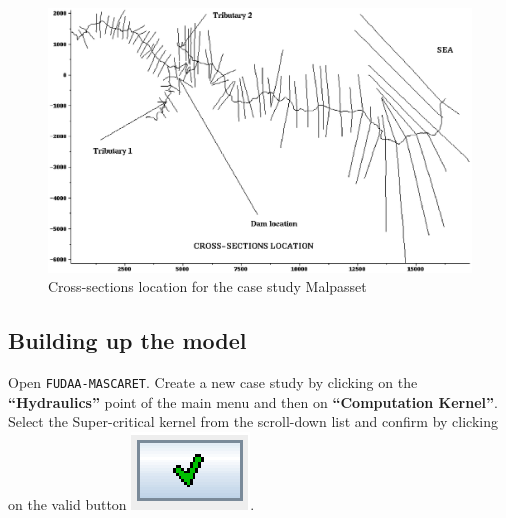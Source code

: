 \documentclass[a4paper,12pt]{article}
\begin{document}
\begin{figure}[h]
  \begin{center}
  \includegraphics[scale=0.6]{cross-sections}
  \caption{Cross-sections location for the case study Malpasset}
  \label{fig:Cross-sections-location-for}
  \end{center}
\end{figure}


\subsection{Building up the model }

\hspace{0.5cm}Open \texttt{FUDAA-MASCARET}. Create a new case study by clicking on the \textbf{{}``Hydraulics''}
point of the main menu and then on \textbf{{}``Computation Kernel''}.
Select the Super-critical kernel from the scroll-down list and confirm
by clicking on the valid button \includegraphics[scale=0.6]{valid}.

\vspace{0.5cm}
\end{document}
